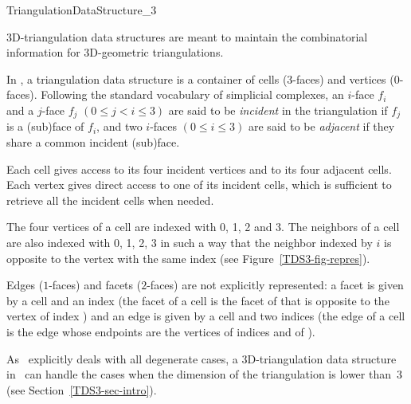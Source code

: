 

\begin{ccRefConcept}{TriangulationDataStructure_3}


\ccDefinition

3D-triangulation data structures are meant to maintain the
combinatorial information for 3D-geometric triangulations.

In \cgal, a triangulation data structure is a container of cells
($3$-faces) and vertices ($0$-faces). Following the standard
vocabulary of simplicial complexes, an $i$-face $f_i$ and a $j$-face
$f_j$ $(0 \leq j < i \leq 3)$ are said to be \textit{incident} in the
triangulation if $f_j$ is a (sub)face of $f_i$, and two $i$-faces $(0
\leq i \leq 3)$ are said to be \textit{adjacent} if they share a
common incident (sub)face.

Each cell gives
access to its four incident vertices and to its four adjacent
cells. Each vertex gives direct access to one of its incident cells, which is 
sufficient to retrieve all the incident cells when needed.

The four vertices of a cell are indexed with 0, 1, 2 and 3.  The
neighbors of a cell are also indexed with 0, 1, 2, 3 
in such a way that the neighbor indexed by $i$ is opposite to the vertex
with the same index (see Figure~\ref{TDS3-fig-repres}).

Edges ($1$-faces) and facets ($2$-faces) are not explicitly
represented: a facet is given by a cell and an index (the facet
 of a cell  is the facet of  that is opposite to
the vertex of index ) and an edge is given by a cell and two
indices (the edge  of a cell  is the edge
whose endpoints are the vertices of indices  and  of
). 

As \cgal\ explicitly deals with all degenerate cases, a
3D-triangulation data structure in \cgal\ can handle the cases when
the dimension of the triangulation is lower than~3 
(see Section~\ref{TDS3-sec-intro}).


\end{ccRefConcept}
